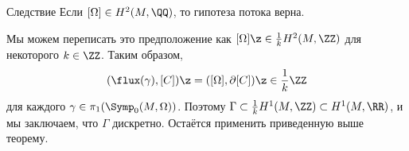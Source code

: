 \begin{thm}{Следствие}
Если $[\Omega] \in H^2(M, \QQ)$, то гипотеза потока верна.
\end{thm}

Мы можем переписать это предположение как $[\Omega] \z\in \tfrac1kH^2(M, \ZZ)$ для некоторого $k\in\ZZ$.
Таким образом, 
\[(\flux(\gamma), [C]) \z= ([\Omega], \partial[C]) \z\in \frac1k\ZZ\] для каждого $\gamma \in \pi_1(\Symp_0(M,\Omega))$.
Поэтому $\Gamma\subset \tfrac1k H^1(M,\ZZ)\subset H^1(M,\RR)$, и мы заключаем, что $\Gamma$ дискретно.
Остаётся применить приведенную выше теорему.
\qeds
